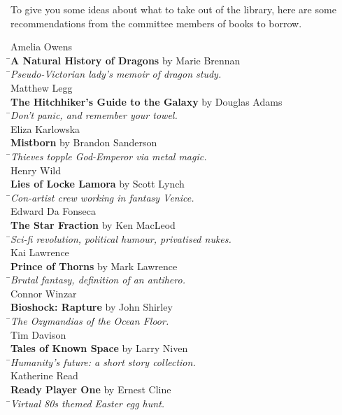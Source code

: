 To give you some ideas about what to take out of the library, here are some recommendations from the committee members of books to borrow. 

\par\vspace{-1em}
\parbox{0.4\textwidth}{
\begin{tabbing}
Amelia Owens\\ \quad\=\quad \textbf{A Natural History of Dragons} by Marie Brennan\\ \quad\=\quad \textit{Pseudo-Victorian lady's memoir of dragon study.}\\[1ex]
Matthew Legg\\ \>\quad \textbf{The Hitchhiker's Guide to the Galaxy} by Douglas Adams\\ \quad\=\quad \textit{Don't panic, and remember your towel.}\\[1ex]
Eliza Karlowska\\ \>\quad \textbf{Mistborn} by Brandon Sanderson\\ \quad\=\quad \textit{Thieves topple God-Emperor via metal magic.}\\[1ex]
Henry Wild \\ \>\quad \textbf{Lies of Locke Lamora} by Scott Lynch\\ \quad\=\quad \textit{Con-artist crew working in fantasy Venice.}\\[1ex]
Edward Da Fonseca\\ \>\quad \textbf{The Star Fraction} by Ken MacLeod\\ \quad\=\quad \textit{Sci-fi revolution, political humour, privatised nukes.}\\[1ex]
Kai Lawrence\\ \>\quad \textbf{Prince of Thorns} by Mark Lawrence\\ \quad\=\quad \textit{Brutal fantasy, definition of an antihero.}\\[1ex]
Connor Winzar\\ \>\quad \textbf{Bioshock: Rapture} by John Shirley\\ \quad\=\quad \textit{The Ozymandias of the Ocean Floor.}\\[1ex]
Tim Davison\\ \>\quad \textbf{Tales of Known Space} by Larry Niven\\ \quad\=\quad \textit{Humanity's future: a short story collection.}\\[1ex]
Katherine Read\\ \>\quad \textbf{Ready Player One} by Ernest Cline\\ \quad\=\quad \textit{Virtual 80s themed Easter egg hunt.}\\
\end{tabbing}
}
